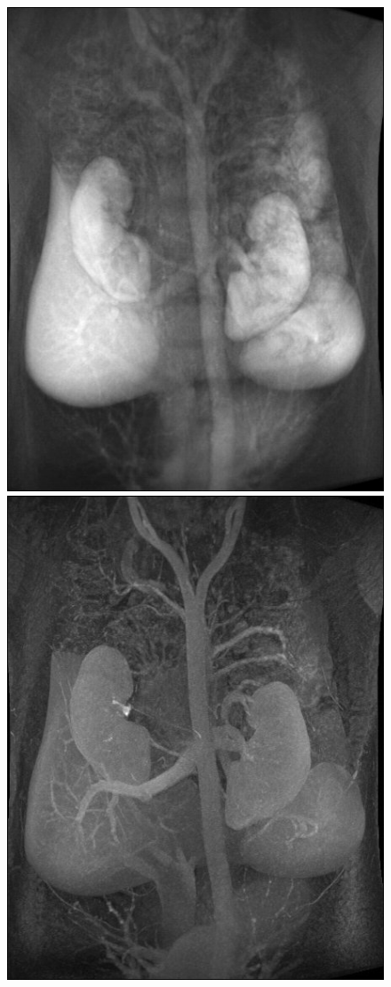 \documentclass[a4paper,11pt]{article}
\begin{document}
\begin{figure}
   \begin{minipage}[c]{.46\linewidth}
      \includegraphics{beaufix_AIP.jpg}
   \end{minipage} \hfill
   \begin{minipage}[c]{.46\linewidth}
      \includegraphics{beaufix_MIP.jpg}
   \end{minipage}
\end{figure}
\end{document}
